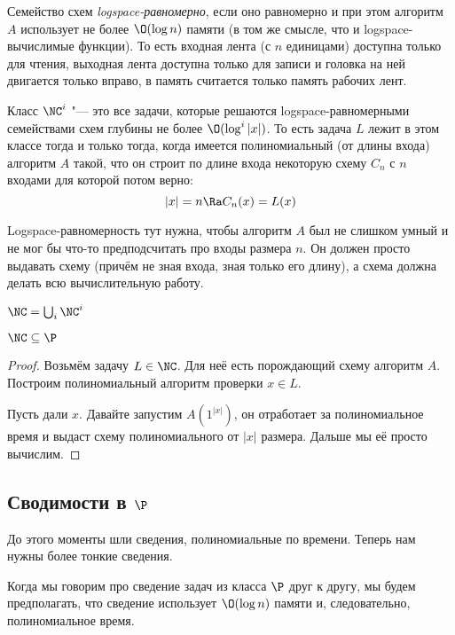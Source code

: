 	\begin{Def}
		Семейство схем \textit{logspace-равномерно}, если оно равномерно и при этом алгоритм $A$ использует не более $\O(\log n)$ памяти (в том же смысле, что и logspace-вычислимые функции).
		То есть входная лента (с $n$ единицами) доступна только для чтения, выходная лента доступна только для записи и головка на ней двигается только вправо,
		в память считается только память рабочих лент.
	\end{Def}
	\begin{Def}
		Класс $\NC^i$ "--- это все задачи, которые решаются logspace-равномерными семействами схем глубины не более $\O(\log^i |x|)$.
		То есть задача $L$ лежит в этом классе тогда и только тогда, когда имеется полиномиальный (от длины входа) алгоритм $A$ такой,
		что он строит по длине входа некоторую схему $C_n$ с $n$ входами для которой потом верно:
		\[
			|x| = n \Ra C_n(x) = L(x)
		\]
	\end{Def}
	\begin{Rem}
		Logspace-равномерность тут нужна, чтобы алгоритм $A$ был не слишком умный и не мог бы что-то предподсчитать про входы размера $n$.
		Он должен просто выдавать схему (причём не зная входа, зная только его длину), а схема должна делать всю вычислительную работу.
	\end{Rem}
	\begin{Def}
		$\NC = \bigcup_i \NC^i$
	\end{Def}

	\begin{lemma}
		$\NC \subseteq \P$
	\end{lemma}
	\begin{proof}
		Возьмём задачу $L \in \NC$.
		Для неё есть порождающий схему алгоритм $A$.
		Построим полиномиальный алгоритм проверки $x \in L$.

		Пусть дали $x$.
		Давайте запустим $A(1^{|x|})$, он отработает за полиномиальное время и выдаст схему полиномиального от $|x|$ размера.
		Дальше мы её просто вычислим.
	\end{proof}

\subsection[Сводимости в P]{Сводимости в $\P$}
	\begin{Rem}
		До этого моменты шли сведения, полиномиальные по времени.
		Теперь нам нужны более тонкие сведения.
	\end{Rem}
	\begin{Def}
		Когда мы говорим про сведение задач из класса $\P$ друг к другу, мы будем предполагать, что
		сведение использует $\O(\log n)$ памяти и, следовательно, полиномиальное время.
	\end{Def}


